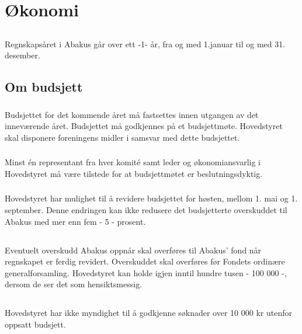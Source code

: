 \section{Økonomi}

\subsection{}
Regnskapsåret i Abakus går over ett -1- år, fra og med 1.januar til og med 31. desember.

\subsection{Om budsjett}
\subsubsection{}
Budsjettet for det kommende året må fastsettes innen utgangen av det inneværende året. Budsjettet må godkjennes på et budsjettmøte. Hovedstyret skal disponere foreningens midler i samsvar med dette budsjettet.

\subsubsection{}
Minst én representant fra hver komité samt leder og økonomiansvarlig i Hovedstyret må være tilstede for at budsjettmøtet er beslutningsdyktig.

\subsubsection{}
Hovedstyret har mulighet til å revidere budsjettet for høsten, mellom 1. mai og 1. september.
Denne endringen kan ikke redusere det budsjetterte overskuddet til Abakus med mer enn fem - 5 - prosent.

\subsection{}
Eventuelt overskudd Abakus oppnår skal overføres til Abakus’ fond når regnskapet er ferdig revidert.
Overskuddet skal overføres før Fondets ordinære generalforsamling.
Hovedstyret kan holde igjen inntil hundre tusen - 100 000 -, dersom de ser det som hensiktsmessig.

\subsection{}
Hovedstyret har ikke myndighet til å godkjenne søknader over 10 000 kr utenfor
oppsatt budsjett.
